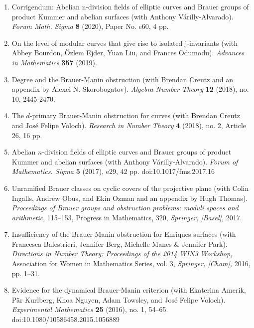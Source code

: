 \documentclass[12pt]{article}
\begin{document}
\begin{enumerate}[itemsep=-1mm, leftmargin=24mm]
             \item {Corrigendum: Abelian n-division fields of elliptic curves and Brauer groups of product Kummer and abelian surfaces} (with Anthony V\'arilly-Alvarado). \textit{Forum Math. Sigma} \textbf{8} (2020), Paper No. e60, 4 pp.
			
			\item {On the level of modular curves that give rise to isolated j-invariants} (with Abbey Bourdon, \"Ozlem Ejder, Yuan Liu, and Frances Odumodu).  \textit{Advances in Mathematics} \textbf{357} (2019).
			
			\item {Degree and the Brauer-Manin obstruction}
            (with Brendan Creutz and an appendix by Alexei N. Skorobogatov).  \textit{Algebra Number Theory} \textbf{12} (2018), no. 10, 2445-2470.
            
			\item The $d$-primary Brauer-Manin obstruction for curves (with Brendan Creutz and Jos\'e Felipe Voloch). \textit{Research in Number Theory} \textbf{4} (2018), no. 2, Article 26, 16 pp.
			
			\item
			{Abelian $n$-division fields of elliptic curves and Brauer groups of product Kummer and abelian surfaces}
			(with Anthony V\'arilly-Alvarado).  \textit{Forum of Mathematics. Sigma} \textbf{5} (2017), e29, 42 pp. 
			doi:10.1017/fms.2017.16

 			\item
			{Unramified Brauer classes on cyclic covers of the projective plane} (with Colin Ingalls, Andrew Obus, and Ekin Ozman and an appendix by Hugh Thomas). \textit{Proceedings of Brauer groups and obstruction problems: moduli spaces and arithmetic}, 115--153, Progress in Mathematics, 320, \textit{Springer, [Basel],} 2017.   

			\item
				{Insufficiency of the Brauer-Manin obstruction for Enriques 
				surfaces}
				(with Francesca Balestrieri, Jennifer Berg, Michelle Manes \&
					Jennifer Park).  \textit{Directions in Number Theory: Proceedings of the 2014 WIN3 Workshop}, Association for Women in Mathematics Series, vol. 3, \textit{Springer, [Cham],} 2016, pp. 1--31.

			\item
			{Evidence for the dynamical Brauer-Manin criterion}
			(with Ekaterina Amerik, P\"ar Kurlberg, Khoa Nguyen, Adam Towsley, 
			and Jos\'e Felipe Voloch). \textit{Experimental Mathematics} \textbf{25} (2016), no. 1, 54--65. doi:10.1080/10586458.2015.1056889


\end{enumerate}
\end{document}
